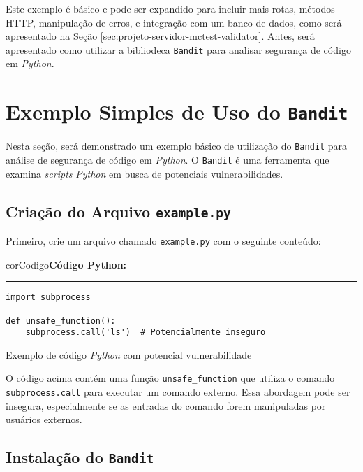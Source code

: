 Este exemplo é básico e pode ser expandido para incluir mais rotas, métodos HTTP, manipulação de erros, e integração com um banco de dados, como será apresentado na Seção \ref{sec:projeto-servidor-mctest-validator}. Antes, será apresentado como utilizar a bibliodeca \texttt{Bandit} para analisar segurança de código em \textit{Python}.

\section{Exemplo Simples de Uso do \texttt{Bandit}}\label{sec:exemplo-bandit}

Nesta seção, será demonstrado um exemplo básico de utilização do \texttt{Bandit} para análise de segurança de código em \textit{Python}. O \texttt{Bandit} é uma ferramenta que examina \textit{scripts} \textit{Python} em busca de potenciais vulnerabilidades.

\subsection{Criação do Arquivo \texttt{example.py}}

Primeiro, crie um arquivo chamado \texttt{example.py} com o seguinte conteúdo:

\begin{listing}[!ht]
    \begin{myboxCode}{corCodigo}{\textbf{Código Python: }}\vspace{3mm}
    \hrule
    \begin{verbatim}
import subprocess

def unsafe_function():
    subprocess.call('ls')  # Potencialmente inseguro
\end{verbatim}
\end{myboxCode}
\caption{Exemplo de código \textit{Python} com potencial vulnerabilidade}
\label{lst:example.py}
\end{listing}

O código acima contém uma função \texttt{unsafe\_function} que utiliza o comando \texttt{subprocess.call} para executar um comando externo. Essa abordagem pode ser insegura, especialmente se as entradas do comando forem manipuladas por usuários externos.

\subsection{Instalação do \texttt{Bandit}}

